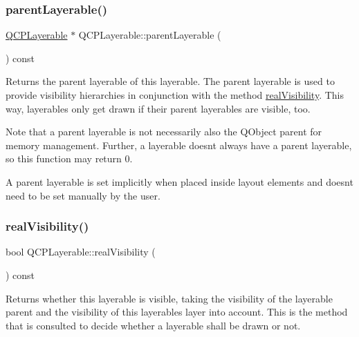 \mbox{\label{class_q_c_p_layerable_aa78b7e644d2c519e1a9a6f2ac5fcd858}} 
\subsubsection{\texorpdfstring{parent\+Layerable()}{parentLayerable()}}
{\footnotesize\ttfamily \hyperlink{class_q_c_p_layerable}{Q\+C\+P\+Layerable} $\ast$ Q\+C\+P\+Layerable\+::parent\+Layerable (\begin{DoxyParamCaption}{ }\end{DoxyParamCaption}) const\hspace{0.3cm}{\ttfamily [inline]}}

Returns the parent layerable of this layerable. The parent layerable is used to provide visibility hierarchies in conjunction with the method \hyperlink{class_q_c_p_layerable_ab054e88f15d485defcb95e7376f119e7}{real\+Visibility}. This way, layerables only get drawn if their parent layerables are visible, too.

Note that a parent layerable is not necessarily also the Q\+Object parent for memory management. Further, a layerable doesn\textquotesingle{}t always have a parent layerable, so this function may return 0.

A parent layerable is set implicitly when placed inside layout elements and doesn\textquotesingle{}t need to be set manually by the user. \mbox{\label{class_q_c_p_layerable_ab054e88f15d485defcb95e7376f119e7}} 
\subsubsection{\texorpdfstring{real\+Visibility()}{realVisibility()}}
{\footnotesize\ttfamily bool Q\+C\+P\+Layerable\+::real\+Visibility (\begin{DoxyParamCaption}{ }\end{DoxyParamCaption}) const}

Returns whether this layerable is visible, taking the visibility of the layerable parent and the visibility of this layerable\textquotesingle{}s layer into account. This is the method that is consulted to decide whether a layerable shall be drawn or not.

